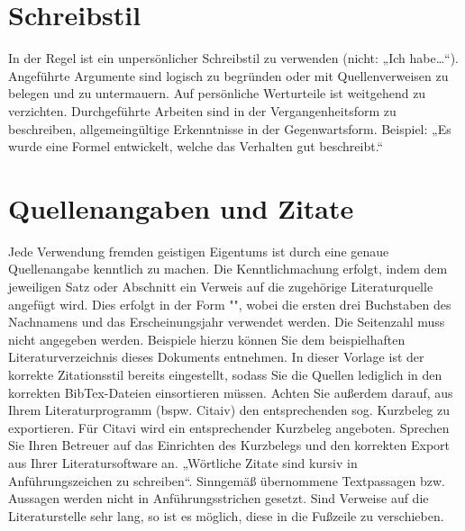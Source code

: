 \section{Schreibstil}
In der Regel ist ein unpersönlicher Schreibstil zu verwenden (nicht: „Ich habe…“). Angeführte Argumente sind logisch zu begründen oder mit Quellenverweisen zu belegen und zu untermauern. Auf persönliche Werturteile ist weitgehend zu verzichten. Durchgeführte Arbeiten sind in der Vergangenheitsform zu beschreiben, allgemeingültige Erkenntnisse in der Gegenwartsform. Beispiel: „Es wurde eine Formel entwickelt, welche das Verhalten gut beschreibt.“

\section{Quellenangaben und Zitate}
Jede Verwendung fremden geistigen Eigentums ist durch eine genaue Quellenangabe kenntlich zu machen. Die Kenntlichmachung erfolgt, indem dem jeweiligen Satz oder Abschnitt ein Verweis auf die zugehörige Literaturquelle angefügt wird. Dies erfolgt in der Form "\cite{Hal_SicherheitsgerichteteEchtzeitsysteme}", wobei die ersten drei Buchstaben des Nachnamens und das Erscheinungsjahr verwendet werden. Die Seitenzahl muss nicht angegeben werden. Beispiele hierzu können Sie dem beispielhaften Literaturverzeichnis dieses Dokuments entnehmen. In dieser Vorlage ist der korrekte Zitationsstil bereits eingestellt, sodass Sie die Quellen lediglich in den korrekten BibTex-Dateien einsortieren müssen. Achten Sie außerdem darauf, aus Ihrem Literaturprogramm (bspw. Citaiv) den entsprechenden sog. Kurzbeleg zu exportieren. Für Citavi wird ein entsprechender Kurzbeleg angeboten. Sprechen Sie Ihren Betreuer auf das Einrichten des Kurzbelegs und den korrekten Export aus Ihrer Literatursoftware an. 
„Wörtliche Zitate sind kursiv in Anführungszeichen zu schreiben“. Sinngemäß übernommene Textpassagen bzw. Aussagen werden nicht in Anführungsstrichen gesetzt.
Sind Verweise auf die Literaturstelle sehr lang, so ist es möglich, diese in die Fußzeile zu verschieben.

